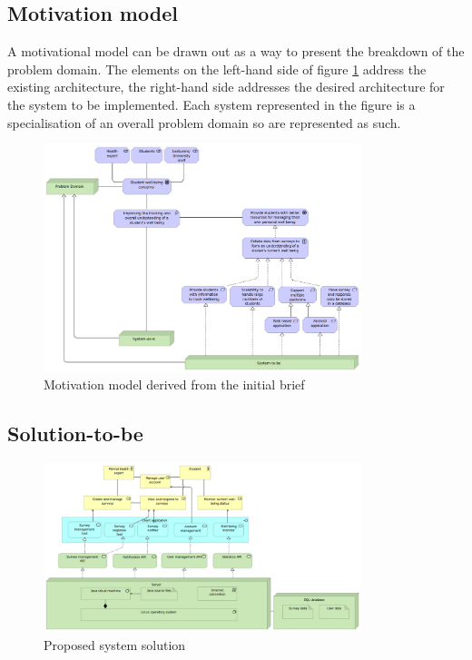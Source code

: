 \subsection{Motivation model}
A motivational model can be drawn out as a way to present the breakdown of the problem domain.
The elements on the left-hand side of figure \ref{motivationmodel} address the existing architecture, the right-hand side addresses the desired
architecture for the system to be implemented.
Each system represented in the figure is a specialisation of an overall problem domain so are represented as such.

\begin{figure}[H]
    \centering
    \includegraphics[width=350px]{images/motivation_model.png}
    \caption{Motivation model derived from the initial brief}
    \label{motivationmodel}
\end{figure}

\subsection{Solution-to-be}

\begin{figure}[H]
    \centering
    \includegraphics[width=350px]{images/solution-to-be.png}
    \caption{Proposed system solution}
    \label{solutiontobe}
\end{figure}


